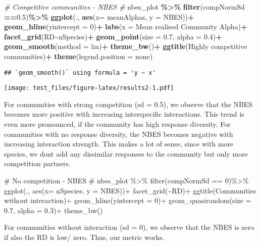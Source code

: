 \documentclass[
]{article}
\newenvironment{Shaded}{\begin{snugshade}}{\end{snugshade}}
\newcommand{\AttributeTok}[1]{\textcolor[rgb]{0.13,0.29,0.53}{#1}}
\newcommand{\CommentTok}[1]{\textcolor[rgb]{0.56,0.35,0.01}{\textit{#1}}}
\newcommand{\DecValTok}[1]{\textcolor[rgb]{0.00,0.00,0.81}{#1}}
\newcommand{\FloatTok}[1]{\textcolor[rgb]{0.00,0.00,0.81}{#1}}
\newcommand{\FunctionTok}[1]{\textcolor[rgb]{0.13,0.29,0.53}{\textbf{#1}}}
\newcommand{\NormalTok}[1]{#1}
\newcommand{\SpecialCharTok}[1]{\textcolor[rgb]{0.81,0.36,0.00}{\textbf{#1}}}
\newcommand{\StringTok}[1]{\textcolor[rgb]{0.31,0.60,0.02}{#1}}
\begin{document}
\begin{Shaded}
\begin{Highlighting}[]
\CommentTok{\# Competitive communities {-} NBES \#}
\NormalTok{nbes\_plot }\SpecialCharTok{\%\textgreater{}\%}
  \FunctionTok{filter}\NormalTok{(compNormSd }\SpecialCharTok{==}\FloatTok{0.5}\NormalTok{)}\SpecialCharTok{\%\textgreater{}\%}
  \FunctionTok{ggplot}\NormalTok{(., }\FunctionTok{aes}\NormalTok{(}\AttributeTok{x=}\NormalTok{ meanAlphas, }\AttributeTok{y =}\NormalTok{ NBES))}\SpecialCharTok{+}
  \FunctionTok{geom\_hline}\NormalTok{(}\AttributeTok{yintercept =} \DecValTok{0}\NormalTok{)}\SpecialCharTok{+}
  \FunctionTok{labs}\NormalTok{(}\AttributeTok{x =} \StringTok{\textquotesingle{}Mean realised Community Alpha\textquotesingle{}}\NormalTok{)}\SpecialCharTok{+}
  \FunctionTok{facet\_grid}\NormalTok{(RD}\SpecialCharTok{\textasciitilde{}}\NormalTok{nSpecies)}\SpecialCharTok{+}
  \FunctionTok{geom\_point}\NormalTok{(}\AttributeTok{size =} \FloatTok{0.7}\NormalTok{, }\AttributeTok{alpha =} \FloatTok{0.4}\NormalTok{)}\SpecialCharTok{+}
  \FunctionTok{geom\_smooth}\NormalTok{(}\AttributeTok{method =} \StringTok{\textquotesingle{}lm\textquotesingle{}}\NormalTok{)}\SpecialCharTok{+}
  \FunctionTok{theme\_bw}\NormalTok{()}\SpecialCharTok{+}
  \FunctionTok{ggtitle}\NormalTok{(}\StringTok{\textquotesingle{}Highly competitive communities\textquotesingle{}}\NormalTok{)}\SpecialCharTok{+}
  \FunctionTok{theme}\NormalTok{(}\AttributeTok{legend.position =} \StringTok{\textquotesingle{}none\textquotesingle{}}\NormalTok{)}
\end{Highlighting}
\end{Shaded}

\begin{verbatim}
## `geom_smooth()` using formula = 'y ~ x'
\end{verbatim}

\texttt{[image: test\_files/figure-latex/results2-1.pdf]}

For communities with strong competition (sd = 0.5), we observe that the
NBES becomes more positive with increasing interspecific interactions.
This trend is even more pronounced, if the community has high response
diversity. For communities with no response diversity, the NBES becomes
negative with increasing interaction strength. This makes a lot of
sense, since with more species, we dont add any dissimilar responses to
the community but only more competition partners.

\begin{Shaded}
\begin{Highlighting}[]
\NormalTok{\# No competition {-} NBES \#}
\NormalTok{nbes\_plot \%\textgreater{}\%}
\NormalTok{  filter(compNormSd == 0)\%\textgreater{}\%}
\NormalTok{  ggplot(., aes(x= nSpecies, y = NBES))+}
\NormalTok{  facet\_grid(\textasciitilde{}RD)+}
\NormalTok{  ggtitle(\textquotesingle{}Communities without interaction\textquotesingle{})+}
\NormalTok{  geom\_hline(yintercept = 0)+}
\NormalTok{  geom\_quasirandom(size = 0.7, alpha = 0.3)+}
\NormalTok{  theme\_bw()}
\end{Highlighting}
\end{Shaded}

For communities without interaction (sd = 0), we observe that the NBES
is zero if also the RD is low/ zero. Thus, our metric works.
\end{document}

